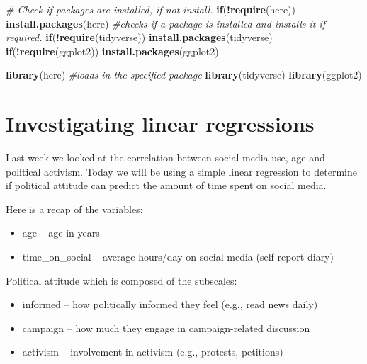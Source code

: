 \documentclass[
]{book}
\newenvironment{Shaded}{\begin{snugshade}}{\end{snugshade}}
\newcommand{\CommentTok}[1]{\textcolor[rgb]{0.56,0.35,0.01}{\textit{#1}}}
\newcommand{\ControlFlowTok}[1]{\textcolor[rgb]{0.13,0.29,0.53}{\textbf{#1}}}
\newcommand{\FunctionTok}[1]{\textcolor[rgb]{0.13,0.29,0.53}{\textbf{#1}}}
\newcommand{\NormalTok}[1]{#1}
\newcommand{\SpecialCharTok}[1]{\textcolor[rgb]{0.81,0.36,0.00}{\textbf{#1}}}
\newcommand{\StringTok}[1]{\textcolor[rgb]{0.31,0.60,0.02}{#1}}
\providecommand{\tightlist}{%
  \setlength{\itemsep}{0pt}\setlength{\parskip}{0pt}}
\begin{document}
\begin{Shaded}
\begin{Highlighting}[]
\CommentTok{\# Check if packages are installed, if not install.}
\ControlFlowTok{if}\NormalTok{(}\SpecialCharTok{!}\FunctionTok{require}\NormalTok{(here)) }\FunctionTok{install.packages}\NormalTok{(}\StringTok{\textquotesingle{}here\textquotesingle{}}\NormalTok{) }\CommentTok{\#checks if a package is installed and installs it if required.}
\ControlFlowTok{if}\NormalTok{(}\SpecialCharTok{!}\FunctionTok{require}\NormalTok{(tidyverse)) }\FunctionTok{install.packages}\NormalTok{(}\StringTok{\textquotesingle{}tidyverse\textquotesingle{}}\NormalTok{)}
\ControlFlowTok{if}\NormalTok{(}\SpecialCharTok{!}\FunctionTok{require}\NormalTok{(ggplot2)) }\FunctionTok{install.packages}\NormalTok{(}\StringTok{\textquotesingle{}ggplot2\textquotesingle{}}\NormalTok{)}

\FunctionTok{library}\NormalTok{(here) }\CommentTok{\#loads in the specified package}
\FunctionTok{library}\NormalTok{(tidyverse)}
\FunctionTok{library}\NormalTok{(ggplot2)}
\end{Highlighting}
\end{Shaded}

\section{Investigating linear regressions}\label{investigating-linear-regressions}

Last week we looked at the correlation between social media use, age and political activism. Today we will be using a simple linear regression to determine if political attitude can predict the amount of time spent on social media.

Here is a recap of the variables:

\begin{itemize}
\tightlist
\item
  age -- age in years
\item
  time\_on\_social -- average hours/day on social media (self-report diary)
\end{itemize}

Political attitude which is composed of the subscales:

\begin{itemize}
\tightlist
\item
  informed -- how politically informed they feel (e.g., read news daily)
\item
  campaign -- how much they engage in campaign-related discussion
\item
  activism -- involvement in activism (e.g., protests, petitions)
\end{itemize}
\end{document}
